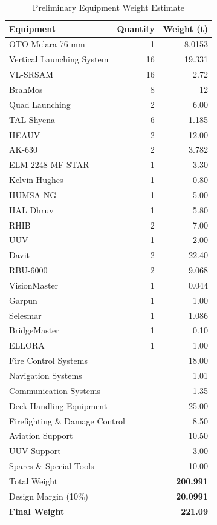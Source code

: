 \documentclass[12pt,a4paper,twoside]{report}
\begin{document}
\begin{table}[H]
\centering
\caption{Preliminary Equipment Weight Estimate}
\label{tab:equipment_weight}
\begin{tabular}{l r r}
\midrule
\textbf{Equipment} & \textbf{Quantity} & \textbf{Weight (t)} \\
\midrule
OTO Melara 76 mm \cite{seaforces_otomelara76} & 1 & 8.0153 \\
Vertical Launching System \cite{seaforces_mk57} & 16 & 19.331 \\
VL-SRSAM \cite{bdl_vlsrsam}& 16 & 2.72 \\
BrahMos \cite{csis2024brahmos}& 8 & 12 \\
Quad Launching \cite{csis2024brahmos} & 2 & 6.00 \\
TAL Shyena \cite{bdl_tal} & 6 & 1.185 \\
HEAUV \cite{kodainya_drdoheauv}& 2 & 12.00 \\
AK-630 \cite{navweaps_ak630}& 2 & 3.782 \\
ELM-2248 MF-STAR \cite{radartutorial_naval_radar}& 1 & 3.30 \\
Kelvin Hughes \cite{hensoldt_sharpeye_mk11}& 1 & 0.80 \\
HUMSA-NG \cite{bel_humsang_mk2}& 1 & 5.00 \\
HAL Dhruv \cite{hal_dhruv}& 1 & 5.80 \\
RHIB \cite{shmgroup_product_catalogue}& 2 & 7.00 \\
UUV \cite{shmgroup_product_catalogue} & 1 & 2.00 \\
Davit \cite{viking_offshore_lifeboats}& 2 & 22.40 \\
RBU-6000 \cite{weaponsystems_rbu6000}& 2 & 9.068 \\
VisionMaster \cite{manualslib_visionmaster_ft}& 1 & 0.044 \\
Garpun \cite{deagel_3ts25e}& 1 & 1.00 \\
Selesmar & 1 & 1.086 \\
BridgeMaster \cite{bmemarine_bridgemaster_e}& 1 & 0.10 \\
ELLORA \cite{mod2007annualreport}& 1 & 1.00 \\
\multicolumn{2}{l}{{Fire Control Systems}} & 18.00 \\
\multicolumn{2}{l}{{Navigation Systems}} & 1.01 \\
\multicolumn{2}{l}{{Communication Systems}} & 1.35 \\
\multicolumn{2}{l}{{Deck Handling Equipment}} & 25.00 \\
\multicolumn{2}{l}{{Firefighting \& Damage Control}} & 8.50 \\
\multicolumn{2}{l}{{Aviation Support}} & 10.50 \\
\multicolumn{2}{l}{{UUV Support}} & 3.00 \\
\multicolumn{2}{l}{{Spares \& Special Tools}} & 10.00 \\
\midrule
\multicolumn{2}{l}{{Total Weight}} & \textbf{200.991} \\
\multicolumn{2}{l}{{Design Margin (10\%)}} & \textbf{20.0991} \\
\multicolumn{2}{l}{\textbf{Final Weight}} & \textbf{221.09} \\
\midrule
\end{tabular}
\end{table}
\end{document}
